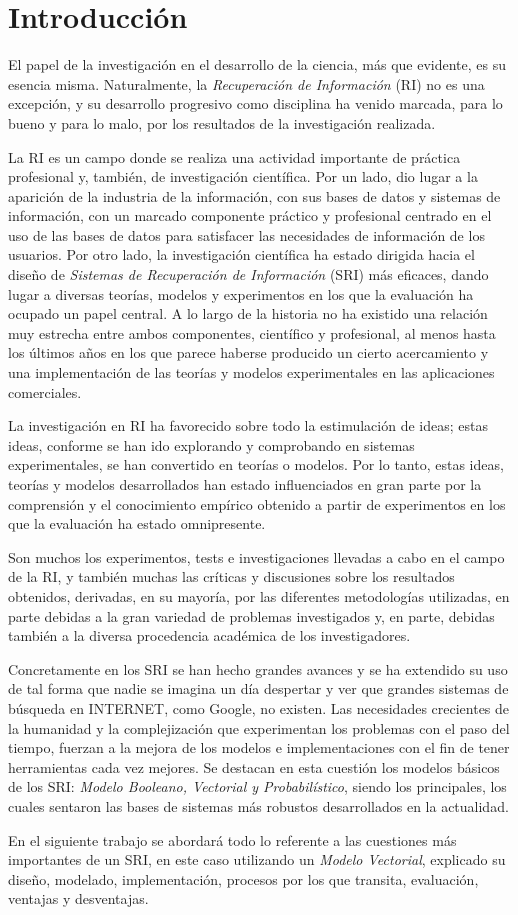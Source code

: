 \section{Introducción}\label{sec:intro}

El papel de la investigación en el desarrollo de la ciencia, más que evidente,
es su esencia misma. Naturalmente, la \emph{Recuperación de Información} (RI)
no es una excepción, y su desarrollo progresivo como disciplina ha venido
marcada, para lo bueno y para lo malo, por los resultados de la investigación
realizada.\cite{chowdhury}

La RI es un campo donde se realiza una actividad importante de práctica
profesional y, también, de investigación científica. Por un lado, dio lugar a
la aparición de la industria de la información, con sus bases de datos y
sistemas de información, con un marcado componente práctico y profesional
centrado en el uso de las bases de datos para satisfacer las necesidades de
información de los usuarios. Por otro lado, la investigación científica ha
estado dirigida hacia el diseño de \emph{Sistemas de Recuperación de
Información} (SRI) más eficaces, dando lugar a diversas teorías, modelos y
experimentos en los que la evaluación ha ocupado un papel central. A lo largo
de la historia no ha existido una relación muy estrecha entre ambos
componentes, científico y profesional, al menos hasta los últimos años en los
que parece haberse producido un cierto acercamiento y una implementación de
las teorías y modelos experimentales en las aplicaciones comerciales.
\cite{ceri}

La investigación en RI ha favorecido sobre todo la estimulación de ideas; estas
ideas, conforme se han ido explorando y comprobando en sistemas experimentales,
se han convertido en teorías o modelos. Por lo tanto, estas ideas, teorías y
modelos desarrollados han estado influenciados en gran parte por la comprensión
y el conocimiento empírico obtenido a partir de experimentos en los que la
evaluación ha estado omnipresente.

Son muchos los experimentos, tests e investigaciones llevadas a cabo en el
campo de la RI, y también muchas las críticas y discusiones sobre los
resultados obtenidos, derivadas, en su mayoría, por las diferentes
metodologías utilizadas, en parte debidas a la gran variedad de problemas
investigados y, en parte, debidas también a la diversa procedencia académica
de los investigadores. \cite{ellis}

Concretamente en los SRI se han hecho grandes avances y se ha extendido su uso
de tal forma que nadie se imagina un día despertar y ver que grandes sistemas
de búsqueda en INTERNET, como Google, no existen. Las necesidades crecientes
de la humanidad y la complejización que experimentan los problemas con el paso
del tiempo, fuerzan a la mejora de los modelos e implementaciones con el fin
de tener herramientas cada vez mejores. Se destacan en esta cuestión los
modelos básicos de los SRI: \emph{Modelo Booleano, Vectorial y Probabilístico},
siendo los principales, los cuales sentaron las bases de sistemas más robustos
desarrollados en la actualidad.

En el siguiente trabajo se abordará todo lo referente a las cuestiones más
importantes de un SRI, en este caso utilizando un \emph{Modelo Vectorial},
explicado su diseño, modelado, implementación, procesos por los que transita,
evaluación, ventajas y desventajas.
